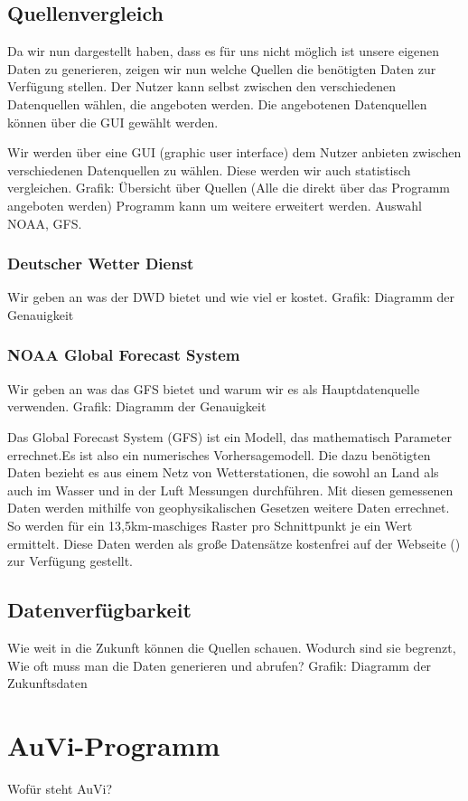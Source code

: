 \documentclass[a4paper,oneside,10pt,titlepage]{article}
\begin{document}
\subsection{Quellenvergleich}
Da wir nun dargestellt haben, dass es für uns nicht möglich ist unsere eigenen Daten zu generieren, zeigen wir nun welche Quellen die benötigten Daten zur Verfügung stellen. Der Nutzer kann selbst zwischen den verschiedenen Datenquellen wählen, die angeboten werden. Die angebotenen Datenquellen können über die GUI gewählt werden.

Wir werden über eine GUI (graphic user interface) dem Nutzer anbieten zwischen verschiedenen Datenquellen zu wählen. Diese werden wir auch statistisch vergleichen.
Grafik: Übersicht über Quellen (Alle die direkt über das Programm angeboten werden)
Programm kann um weitere erweitert werden.
Auswahl NOAA, GFS.
\subsubsection{Deutscher Wetter Dienst}
Wir geben an was der DWD bietet und wie viel er kostet.
Grafik: Diagramm der Genauigkeit
\subsubsection{NOAA Global Forecast System}
Wir geben an was das GFS bietet und warum wir es als Hauptdatenquelle verwenden.
Grafik: Diagramm der Genauigkeit

Das Global Forecast System (GFS) ist ein Modell, das mathematisch Parameter errechnet.Es ist also ein numerisches Vorhersagemodell. Die dazu benötigten Daten bezieht es aus einem Netz von Wetterstationen, die sowohl an Land als auch im Wasser und in der Luft Messungen durchführen. Mit diesen gemessenen Daten werden mithilfe von geophysikalischen Gesetzen weitere Daten errechnet. So werden für ein 13,5km-maschiges Raster pro Schnittpunkt je ein Wert ermittelt. Diese Daten werden als große Datensätze kostenfrei auf der Webseite ()  zur Verfügung gestellt.
\subsection{Datenverfügbarkeit}
Wie weit in die Zukunft können die Quellen schauen. Wodurch sind sie begrenzt, Wie oft muss man die Daten generieren und abrufen?
Grafik: Diagramm der Zukunftsdaten
\section{AuVi-Programm}
Wofür steht AuVi?
\end{document}
